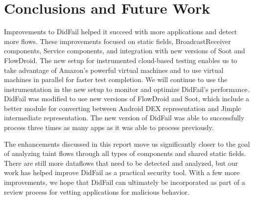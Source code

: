\chapter{Conclusions and Future Work}
Improvements to DidFail helped it succeed with more applications and detect more flows. 
These improvements focused on static fields, BroadcastReceiver components, Service components, and integration with new versions of Soot and FlowDroid.
 The new setup for instrumented cloud-based testing enables us to take advantage of Amazon's powerful virtual machines and to use virtual machines in parallel for faster test completion. We will continue to use the instrumentation in the new setup to monitor and optimize DidFail's performance. DidFail was modified to use new versions of FlowDroid and Soot, which include a better module for converting between Android DEX representation and Jimple intermediate representation. The new version of DidFail was able to successfully process three times as many apps as it was able to process previously.
 
The enhancements discussed in this report move us significantly closer to the goal of analyzing taint flows through all types of components and shared static fields. There are still more dataflows that need to be detected and analyzed, but our work has helped improve DidFail as a practical security tool. 
 With a few more improvements, we hope that DidFail can ultimately be incorporated as part of a review process for vetting applications for malicious behavior. 


%



